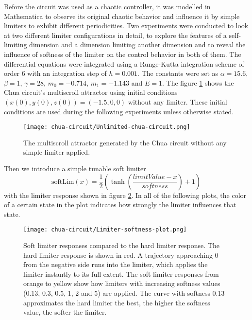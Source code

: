 \documentclass[main]{subfiles}
\begin{document}
Before the circuit was used as a chaotic controller, it was modelled in Mathematica to observe its original chaotic behavior and influence it by simple limiters to exhibit different periodicities. %
%
Two experiments were conducted to look at two different limiter configurations in detail, to explore the features of a self-limiting dimension and a dimension limiting another dimension and to reveal the influence of softness of the limiter on the control behavior in both of them. %
%
The differential equations were integrated using a Runge-Kutta integration scheme of order 6 with an integration step of \(h=0.001\). %
%
The constants were set as \(\alpha = 15.6\), \(\beta = 1\), \(\gamma = 28\), \(m_0 = -0.714\), \(m_1 = -1.143\) and \(E = 1\). %
%
The figure \ref{figure:chaoticchuacircuit} shows the Chua circuit's multiscroll attractor using initial conditions \((x(0),y(0),z(0)) = (-1.5,0,0)\) without any limiter. %
%
These initial conditions are used during the following experiments unless otherwise stated.

\begin{figure}[H]
\centering
\texttt{[image: chua-circuit/Unlimited-chua-circuit.png]}
\caption[The multiscroll attractor in the Chua circuit]{The multiscroll attractor generated by the Chua circuit without any simple limiter applied.}
\label{figure:chaoticchuacircuit}
\end{figure}

Then we introduce a simple tunable soft limiter \[\text{softLim}(x) = \frac{1}{2} \left(\tanh\left(\frac{limitValue - x}{softness}\right) + 1\right)\] with the limiter response shown in figure \ref{figure:softlimiterresponse}. %
%
In all of the following plots, the color of a certain state in the plot indicates how strongly the limiter influences that state.

\begin{figure}[H]
\centering
\texttt{[image: chua-circuit/Limiter-softness-plot.png]}
\caption[Soft limiter responses]{Soft limiter responses compared to the hard limiter response. The hard limiter response is shown in red. A trajectory approaching 0 from the negative side runs into the limiter, which applies the limiter instantly to its full extent. The soft limiter responses from orange to yellow show how limiters with increasing softness values (0.13, 0.3, 0.5, 1, 2 and 5) are applied. The curve with softness 0.13 approximates the hard limiter the best, the higher the softness value, the softer the limiter.}
\label{figure:softlimiterresponse}
\end{figure}
\end{document}
